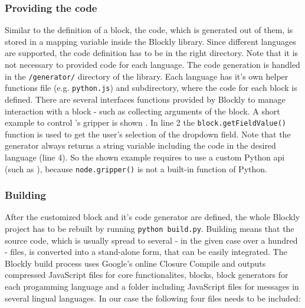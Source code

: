 \subsubsection{Providing the code}
Similar to the definition of a block, the code, which is generated out of them, is stored in a mapping variable inside the Blockly library. Since different languages are supported, the code definition has to be in the right directory. Note that it is not necessary to provided code for each language. The code generation is handled in the \lstinline!/generator/! directory of the library. Each language has it's own helper functions file (e.g. \lstinline!python.js!) and subdirectory, where the code for each block is defined. There are several interfaces functions provided by Blockly to manage interaction with a block - such as collecting arguments of the block. A short example to control \hobbit{}'s gripper is shown . In line 2 the \lstinline!block.getFieldValue()! function is used to get the user's selection of the dropdown field. Note that the generator always returns a string variable including the code in the desired language (line 4). So the shown example requires to use a custom Python \gls{api} (such as ), because \lstinline!node.gripper()! is not a built-in function of Python. \\

\begin{figure}[htbp]
	
\end{figure}

\subsubsection{Building}
After the customized block and it's code generator are defined, the whole Blockly project has to be rebuilt by running \lstinline!python build.py!. Building means that the source code, which is usually spread to several - in the given case over a hundred - files, is converted into a stand-alone form, that can be easily integrated. The Blockly build process uses Google's online Closure Compile and outputs compressed JavaScript files for core functionalites, blocks, block generators for each progamming language and a folder including JavaScript files for messages in several lingual languages. In our case the following four files needs to be included:

